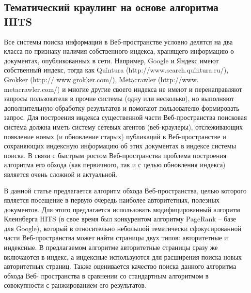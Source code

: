 \subsection{Тематический краулинг на основе алгоритма HITS}\label{subsec:ch1/sec3/sub6}

Все системы поиска информации в Веб-пространстве условно делятся на два класса по признаку наличия собственного индекса, хранящего информацию о документах, опубликованных в сети. Например, Google и Яндекс имеют собственный индекс, тогда как Quintura (http://www.search.quintura.ru/), Grokker (http:// www.grokker.com/), Metacrawler (http://www. metacrawler.com/) и многие другие своего индекса не имеют и перенаправляют запросы пользователя в прочие системы (одну или несколько), но выполняют дополнительную обработку результатов и помогают пользователю формировать запрос. Для построения индекса существенной части Веб-пространства поисковая система должна иметь систему сетевых агентов (веб-краулеры), отслеживающих появление новых (и обновление старых) публикаций в Веб-пространстве и сохраняющих индексную информацию об этих документах в индексе системы поиска. В связи с быстрым ростом Веб-пространства \cite{Kahle,HubermanAdamic} проблема построения алгоритма его обхода (как первичного, так и с целью обновления индекса) является очень сложной и актуальной.

В данной статье предлагается алгоритм обхода Веб-пространства, целью которого является посещение в первую очередь наиболее авторитетных, полезных документов. Для этого предлагается использовать модифицированный алгоритм Клеинберга HITS (в свое время был конкурентом алгоритму PageRank -- базе для Google), который в относительно небольшой тематически сфокусированной части Веб-пространства может найти страницы двух типов: авторитетные и индексные. В предлагаемом алгоритме авторитетные страницы сразу же включаются в индекс, а индексные используются для расширения поиска новых авторитетных страниц. Также оценивается качество поиска данного алгоритма обхода Веб- пространства в сравнении со стандартным алгоритмом в совокупности с ранжированием его результатов.

